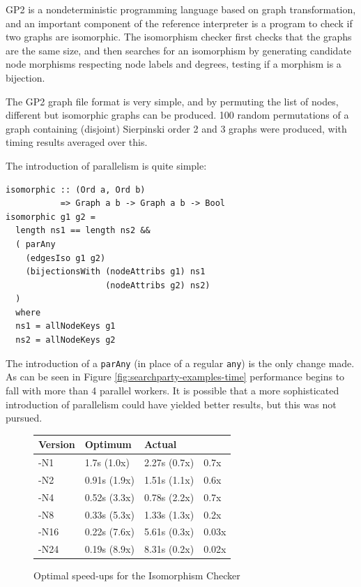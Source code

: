 GP2\cite{gp2} is a nondeterministic programming language based on
graph transformation, and an important component of the reference
interpreter is a program to check if two graphs are isomorphic. The
isomorphism checker first checks that the graphs are the same size,
and then searches for an isomorphism by generating candidate node
morphisms respecting node labels and degrees, testing if a morphism is
a bijection.

The GP2 graph file format is very simple, and by permuting the list of
nodes, different but isomorphic graphs can be produced. 100 random
permutations of a graph containing (disjoint) Sierpinski order 2 and 3
graphs were produced, with timing results averaged over this.

The introduction of parallelism is quite simple:

\begin{verbatim}
isomorphic :: (Ord a, Ord b)
           => Graph a b -> Graph a b -> Bool
isomorphic g1 g2 =
  length ns1 == length ns2 &&
  ( parAny
    (edgesIso g1 g2)
    (bijectionsWith (nodeAttribs g1) ns1
                    (nodeAttribs g2) ns2)
  )
  where
  ns1 = allNodeKeys g1
  ns2 = allNodeKeys g2
\end{verbatim}

The introduction of a \verb|parAny| (in place of a regular \verb|any|)
is the only change made. As can be seen in Figure
\ref{fig:searchparty-examples-time} performance begins to fall with
more than 4 parallel workers. It is possible that a more sophisticated
introduction of parallelism could have yielded better results, but
this was not pursued.

\begin{figure}[t]
  \centering
  \begin{tabularx}{\linewidth}{|X|X|X|X|}
    \hline \textbf{Version} & \textbf{Optimum} & \textbf{Actual} & \\
    \hline -N1  & 1.7s  (1.0x) & 2.27s (0.7x) & 0.7x \\
           -N2  & 0.91s (1.9x) & 1.51s (1.1x) & 0.6x \\
           -N4  & 0.52s (3.3x) & 0.78s (2.2x) & 0.7x \\
           -N8  & 0.33s (5.3x) & 1.33s (1.3x) & 0.2x \\
           -N16 & 0.22s (7.6x) & 5.61s (0.3x) & 0.03x \\
           -N24 & 0.19s (8.9x) & 8.31s (0.2x) & 0.02x \\
    \hline
  \end{tabularx}
  \caption{Optimal speed-ups for the Isomorphism Checker}
  \label{fig:searchparty-examples-isos-amdahl}
\end{figure}

